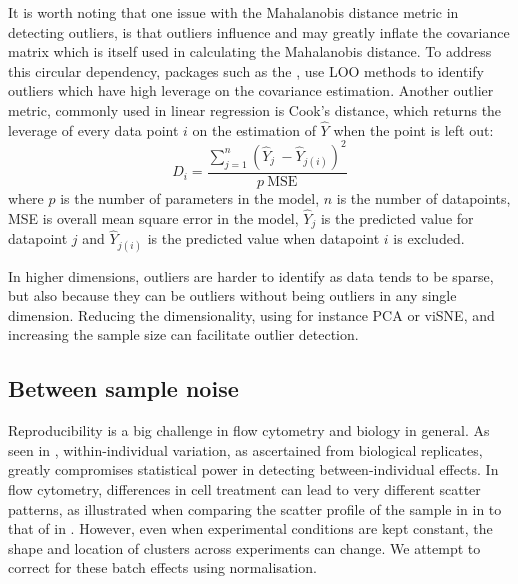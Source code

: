 It is worth noting that one issue with the Mahalanobis distance metric in detecting outliers, is that outliers influence and may greatly inflate the covariance matrix which is itself used in calculating the Mahalanobis distance.
To address this circular dependency, packages such as the , use \gls{LOO} methods to identify outliers which have high leverage on the covariance estimation.
Another outlier metric, commonly used in linear regression is Cook's distance, which returns the leverage of every data point $i$  on the estimation of $\hat Y$ when the point is left out:
\[
D_i = \frac{ \sum_{j=1}^n (\hat Y_j\ - \hat Y_{j(i)})^2 }{p \ \mathrm{MSE}}
\]
where $p$ is the number of parameters in the model, $n$ is the number of datapoints, MSE is overall mean square error in the model, $ \hat Y_j $ is the predicted value for datapoint $j$ and $ \hat Y_{j(i)} $ is the predicted value when datapoint $i$ is excluded.

In higher dimensions, outliers are harder to identify as data tends to be sparse, but also because they can be outliers without being outliers in any single dimension.
Reducing the dimensionality, using for instance \gls{PCA} or \gls{viSNE}, and increasing the sample size can facilitate outlier detection.


\subsection{Between sample noise}


Reproducibility is a big challenge in flow cytometry and biology in general.
As seen in , within-individual variation, as ascertained from biological replicates, greatly compromises statistical power in detecting between-individual effects.
In flow cytometry, differences in cell treatment can lead to very different scatter patterns, as illustrated when comparing the scatter profile of the sample in  in  to that of  in .
However, even when experimental conditions are kept constant,
the shape and location of clusters across experiments can change.
We attempt to correct for these batch effects using normalisation.

